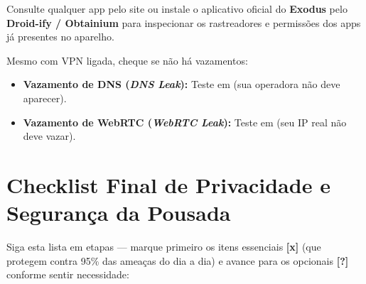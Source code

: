 \documentclass{pousadaguide}
\begin{document}
\begin{dica}
Consulte qualquer app pelo site  ou instale o aplicativo oficial do \textbf{Exodus} pelo \textbf{Droid-ify / Obtainium} para inspecionar os rastreadores e permissões dos apps já presentes no aparelho.
\end{dica}

\begin{atencao}
Mesmo com VPN ligada, cheque se não há vazamentos:
\begin{itemize}
  \item \textbf{Vazamento de DNS (\emph{DNS Leak}):} Teste em  (sua operadora não deve aparecer).
  \item \textbf{Vazamento de WebRTC (\emph{WebRTC Leak}):} Teste em  (seu IP real não deve vazar).
\end{itemize}
\end{atencao}

\clearpage
\section{Checklist Final de Privacidade e Segurança da Pousada}

Siga esta lista em etapas — marque primeiro os itens essenciais \textcolor{pgSignal}{\pgmono\bfseries[x]} (que protegem contra 95\% das ameaças do dia a dia) e avance para os opcionais \textcolor{pgAmber}{\pgmono\bfseries[?]} conforme sentir necessidade:
\end{document}
